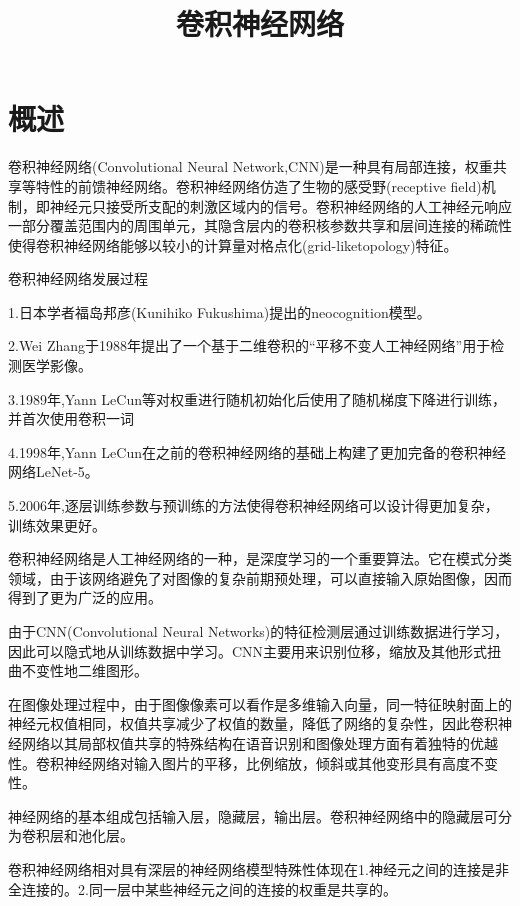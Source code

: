 \documentclass[openbib]{article}
\begin{document}
	\title{卷积神经网络}
	
	\maketitle
	
	\newpage
	\tableofcontents
	\newpage
	
\section{概述}
卷积神经网络(Convolutional Neural Network,CNN)是一种具有局部连接，权重共享等特性的前馈神经网络。卷积神经网络仿造了生物的感受野(receptive field)机制，即神经元只接受所支配的刺激区域内的信号。卷积神经网络的人工神经元响应一部分覆盖范围内的周围单元，其隐含层内的卷积核参数共享和层间连接的稀疏性使得卷积神经网络能够以较小的计算量对格点化(grid-liketopology)特征。

\begin{center}
	卷积神经网络发展过程
\end{center}

1.日本学者福岛邦彦(Kunihiko Fukushima)提出的neocognition模型。

2.Wei Zhang于1988年提出了一个基于二维卷积的“平移不变人工神经网络”用于检测医学影像。

3.1989年,Yann LeCun等对权重进行随机初始化后使用了随机梯度下降进行训练，并首次使用卷积一词

4.1998年,Yann LeCun在之前的卷积神经网络的基础上构建了更加完备的卷积神经网络LeNet-5。

5.2006年,逐层训练参数与预训练的方法使得卷积神经网络可以设计得更加复杂，训练效果更好。

卷积神经网络是人工神经网络的一种，是深度学习的一个重要算法。它在模式分类领域，由于该网络避免了对图像的复杂前期预处理，可以直接输入原始图像，因而得到了更为广泛的应用。

由于CNN(Convolutional Neural Networks)的特征检测层通过训练数据进行学习，因此可以隐式地从训练数据中学习。CNN主要用来识别位移，缩放及其他形式扭曲不变性地二维图形。

在图像处理过程中，由于图像像素可以看作是多维输入向量，同一特征映射面上的神经元权值相同，权值共享减少了权值的数量，降低了网络的复杂性，因此卷积神经网络以其局部权值共享的特殊结构在语音识别和图像处理方面有着独特的优越性。卷积神经网络对输入图片的平移，比例缩放，倾斜或其他变形具有高度不变性。

神经网络的基本组成包括输入层，隐藏层，输出层。卷积神经网络中的隐藏层可分为卷积层和池化层。

卷积神经网络相对具有深层的神经网络模型特殊性体现在1.神经元之间的连接是非全连接的。2.同一层中某些神经元之间的连接的权重是共享的。
\end{document}
